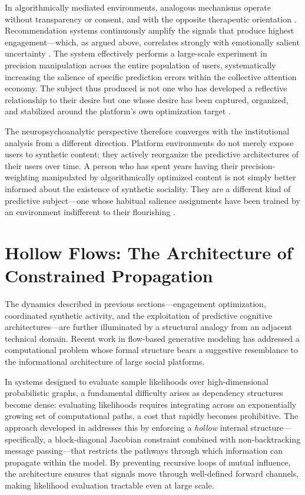 \documentclass[12pt,a4paper]{article}
\begin{document}
In algorithmically mediated environments, analogous mechanisms operate without transparency or
consent, and with the opposite therapeutic orientation \citep{zuboff2019}. Recommendation systems
continuously amplify the signals that produce highest engagement---which, as argued above,
correlates strongly with emotionally salient uncertainty \citep{vosoughi2018}. The system
effectively performs a large-scale experiment in precision manipulation across the entire
population of users, systematically increasing the salience of specific prediction errors within
the collective attention economy. The subject thus produced is not one who has developed a
reflective relationship to their desire but one whose desire has been captured, organized, and
stabilized around the platform's own optimization target \citep{zuboff2019,dallaglio2024}.

The neuropsychoanalytic perspective therefore converges with the institutional analysis from a
different direction. Platform environments do not merely expose users to synthetic content; they
actively reorganize the predictive architectures of their users over time. A person who has
spent years having their precision-weighting manipulated by algorithmically optimized content is
not simply better informed about the existence of synthetic sociality. They are a different kind
of predictive subject---one whose habitual salience assignments have been trained by an environment
indifferent to their flourishing \citep{solms2021,dallaglio2024}.

\section{Hollow Flows: The Architecture of Constrained Propagation}

The dynamics described in previous sections---engagement optimization, coordinated synthetic
activity, and the exploitation of predictive cognitive architectures---are further illuminated
by a structural analogy from an adjacent technical domain. Recent work in flow-based generative
modeling has addressed a computational problem whose formal structure bears a suggestive
resemblance to the informational architecture of large social platforms.

In systems designed to evaluate sample likelihoods over high-dimensional probabilistic graphs,
a fundamental difficulty arises as dependency structures become dense: evaluating likelihoods
requires integrating across an exponentially growing set of computational paths, a cost that
rapidly becomes prohibitive. The approach developed in \citet{gloy2025} addresses this by
enforcing a \emph{hollow} internal structure---specifically, a block-diagonal Jacobian
constraint combined with non-backtracking message passing---that restricts the pathways through
which information can propagate within the model. By preventing recursive loops of mutual
influence, the architecture ensures that signals move through well-defined forward channels,
making likelihood evaluation tractable even at large scale.
\end{document}
